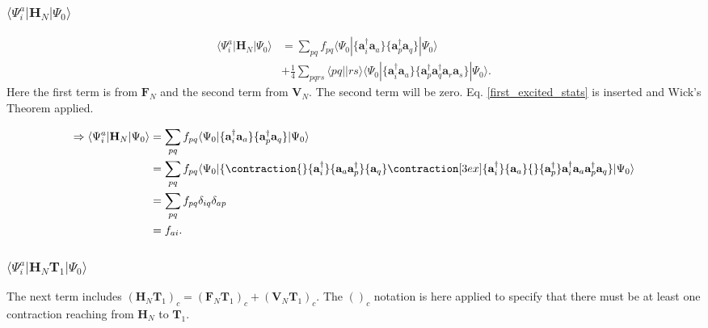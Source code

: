 \subsubsection{$\langle \Psi_i^a | \textbf{H}_N | \Psi_0 \rangle$}

\begin{align}
\langle \Psi_i^a | \textbf{H}_N | \Psi_0 \rangle & = 
\sum_{pq} f_{pq} \langle \Psi_0| \{ \textbf{a}^{\dag}_i \textbf{a}_a \} \{ \textbf{a}^{\dag}_p \textbf{a}_q \} | \Psi_0 \rangle \nonumber \\ &
+ \frac{1}{4} \sum_{pqrs} \langle pq||rs \rangle  \langle \Psi_0| \{ \textbf{a}^{\dag}_i \textbf{a}_a \} \{ \textbf{a}^{\dag}_p \textbf{a}^{\dag}_q \textbf{a}_r \textbf{a}_s \} | \Psi_0 \rangle .
\end{align}
Here the first term is from $\textbf{F}_N$ and the second term from $\textbf{V}_N$. The second term will be zero. Eq. \eqref{first_excited_stats} is inserted and Wick's Theorem applied.

\begin{align}
\Rightarrow \langle \Psi_i^a | \textbf{H}_N | \Psi_0 \rangle & = \sum_{pq} f_{pq} \langle \Psi_0| \{ \textbf{a}^{\dag}_i \textbf{a}_a \} \{ \textbf{a}^{\dag}_p \textbf{a}_q \} | \Psi_0 \rangle \nonumber \\ &
= \sum_{pq} f_{pq} \langle \Psi_0| \{
\contraction{}{\textbf{a}^{\dag}_i}{\textbf{a}_a \textbf{a}^{\dag}_p}{\textbf{a}_q}
\contraction[3ex]{\textbf{a}^{\dag}_i}{\textbf{a}_a}{}{\textbf{a}^{\dag}_p}
\textbf{a}^{\dag}_i \textbf{a}_a \textbf{a}^{\dag}_p \textbf{a}_q 
 \} | \Psi_0 \rangle \nonumber \\ &
= \sum_{pq} f_{pq} \delta_{iq} \delta_{ap} \nonumber \\ &
= f_{ai} . \label{t1amp_1}
\end{align}

\subsubsection{$\langle \Psi_i^a | \textbf{H}_N \textbf{T}_1 | \Psi_0 \rangle$}

The next term includes $(\textbf{H}_N \textbf{T}_1)_c = (\textbf{F}_N \textbf{T}_1)_c + (\textbf{V}_N \textbf{T}_1)_c$. The $()_c$ notation is here applied to specify that there must be at least one contraction reaching from $\textbf{H}_N$ to $\textbf{T}_1$.

